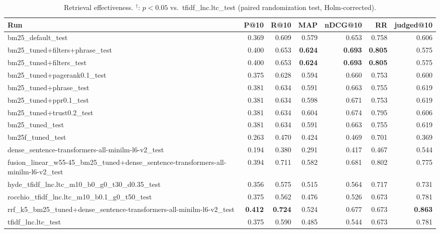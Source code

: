 \begin{table}[t]
\centering
\begin{tabular}{lrrrrrr}
\toprule
Run & P@10 & R@10 & MAP & nDCG@10 & RR & judged@10 \\
\midrule
bm25\_default\_test & 0.369 & 0.609 & 0.579 & 0.653 & 0.758 & 0.606 \\
bm25\_tuned+filters+phrase\_test & 0.400 & 0.653 & \textbf{0.624} & \textbf{0.693} & \textbf{0.805} & 0.575 \\
bm25\_tuned+filters\_test & 0.400 & 0.653 & \textbf{0.624} & \textbf{0.693} & \textbf{0.805} & 0.575 \\
bm25\_tuned+pagerank0.1\_test & 0.375 & 0.628 & 0.594 & 0.660 & 0.753 & 0.600 \\
bm25\_tuned+phrase\_test & 0.381 & 0.634 & 0.591 & 0.663 & 0.755 & 0.619 \\
bm25\_tuned+ppr0.1\_test & 0.381 & 0.634 & 0.598 & 0.671 & 0.753 & 0.619 \\
bm25\_tuned+trust0.2\_test & 0.381 & 0.634 & 0.604 & 0.674 & 0.795 & 0.606 \\
bm25\_tuned\_test & 0.381 & 0.634 & 0.591 & 0.663 & 0.755 & 0.619 \\
bm25f\_tuned\_test & 0.263 & 0.470 & 0.424 & 0.469 & 0.701 & 0.369 \\
dense\_sentence-transformers-all-minilm-l6-v2\_test & 0.194 & 0.380 & 0.291 & 0.417 & 0.467 & 0.544 \\
fusion\_linear\_w55-45\_bm25\_tuned+dense\_sentence-transformers-all-minilm-l6-v2\_test & 0.394 & 0.711 & 0.582 & 0.681 & 0.802 & 0.775 \\
hyde\_tfidf\_lnc.ltc\_m10\_b0\_g0\_t30\_d0.35\_test & 0.356 & 0.575 & 0.515 & 0.564 & 0.717 & 0.731 \\
rocchio\_tfidf\_lnc.ltc\_m10\_b0.1\_g0\_t50\_test & 0.375 & 0.562 & 0.476 & 0.526 & 0.673 & 0.781 \\
rrf\_k5\_bm25\_tuned+dense\_sentence-transformers-all-minilm-l6-v2\_test & \textbf{0.412} & \textbf{0.724} & 0.524 & 0.677 & 0.673 & \textbf{0.863} \\
tfidf\_lnc.ltc\_test & 0.375 & 0.590 & 0.485 & 0.544 & 0.673 & 0.781 \\
\bottomrule
\end{tabular}
\caption{Retrieval effectiveness. $^\dagger$: $p<0.05$ vs.\ tfidf\_lnc.ltc\_test (paired randomization test, Holm-corrected).}
\end{table}
